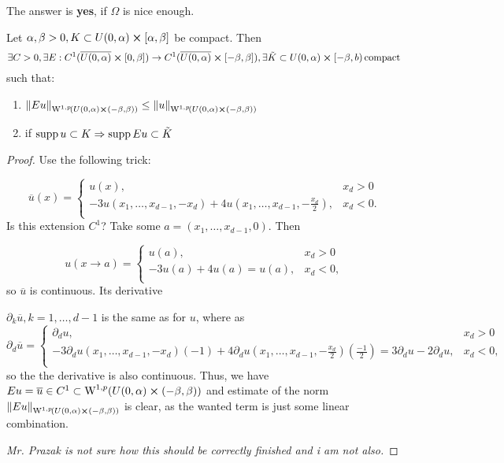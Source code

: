 \documentclass{article}
\begin{document}
The answer is \textbf{yes}, if $\Omega$ is nice enough.

\begin{lemma}
	Let $\alpha, \beta >0, K \subset U(0,\alpha) \cross [\alpha,\beta]$ be compact. Then
	\[
		\exists C>0, \exists E:C^1(\overline{U(0,\alpha)} \cross [0,\beta]) \to C^1(\overline{U(0,\alpha)} \cross [-\beta, \beta]), \exists \tilde{K} \subset U(0,\alpha) \cross [-\beta, b) \, \text{compact} \,
	\]
	such that:
	\begin{enumerate}
		\item $\norm{Eu}_{\WkpSet[1][p]{U(0,\alpha) \cross (-\beta,\beta)}} \leq \norm{u}_{\WkpSet[1][p]{U(0,\alpha) \cross (-\beta, \beta)}} $
		\item if $\operatorname{supp} u \subset K \Rightarrow \operatorname{supp} Eu \subset \tilde{K}$
	\end{enumerate}
\end{lemma}

\begin{proof}
	Use the following trick:

	\begin{equation*}
		\overline{u}(x) = 
		\begin{cases}
			u(x),& x_d > 0 \\
			-3u(x_1, \dots, x_{d-1}, -x_d) + 4u(x_1, \dots, x_{d-1},-\frac{x_d}{2}) ,& x_d < 0.\\
		\end{cases}
	\end{equation*}
	Is this extension $C^1$? Take some $a=(x_1,\dots, x_{d-1},0)$. Then

	\begin{equation*}
		u(x \to a) = 
		\begin{cases}
			u(a), & x_d>0 \\
			-3u(a)+ 4u(a) = u(a), & x_d<0, \\
		\end{cases}
	\end{equation*}
	so $\overline{u}$ is continuous. Its derivative

	$\partial_{k}\overline{u}, k=1, \dots, d-1$ is the same as for $u$, where as
	\begin{equation*}
		\partial_{d}\overline{u} = 
		\begin{cases}
			\partial_{d}u ,& x_d >0 \\
			-3 \partial_{d} u (x_1,\dots,x_{d-1},-x_d)(-1) + 4 \partial_{d}u(x_1,\dots,x_{d-1},-\frac{x_d}{2}) (\frac{-1}{2}) = 3 \partial_{d} u - 2 \partial_{d}u ,& x_d<0,\\
		\end{cases}
	\end{equation*}
	so the the derivative is also continuous. Thus, we have $Eu = \overline{u} \in C^1 \subset \WkpSet[1][p]{U(0,\alpha) \cross (-\beta,\beta)}$ and estimate of the norm $\norm{Eu}_{\WkpSet[1][p]{U(0,\alpha) \cross (-\beta,\beta)}}$ is clear, as the wanted term is just some linear combination. 



	\textit{Mr. Prazak is not sure how this should be correctly finished and i am not also.}
\end{proof}
\end{document}

